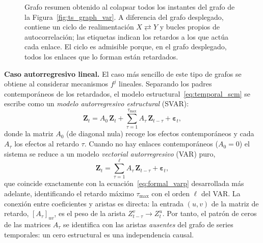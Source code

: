 \documentclass[12pt]{report} %
\begin{document}
\begin{figure}[H]
    \centering
    \begingroup
    \shorthandoff{<>}
    \endgroup
    \caption[Grafo resumen del proceso autorregresivo bivariante]{Grafo resumen obtenido al colapsar todos los instantes del grafo de la Figura~\ref{fig:ts_graph_var}. A diferencia del grafo desplegado, contiene un ciclo de realimentación $X \rightleftarrows Y$ y bucles propios de autocorrelación; las etiquetas indican los retardos a los que actúa cada enlace. El ciclo es admisible porque, en el grafo desplegado, todos los enlaces que lo forman están retardados.}
    \label{fig:ts_summary_var}
\end{figure}

\textbf{Caso autorregresivo lineal.} El caso más sencillo de este tipo de grafos se obtiene al considerar mecanismos $f^j$ lineales. Separando los padres contemporáneos de los retardados, el modelo estructural~\eqref{eq:temporal_scm} se escribe como un \emph{modelo autorregresivo estructural} (SVAR):
\begin{equation}
    \mathbf{Z}_t = A_0\,\mathbf{Z}_t + \sum_{\tau=1}^{\tau_{\max}} A_\tau\,\mathbf{Z}_{t-\tau} + \boldsymbol{\varepsilon}_t,
    \label{eq:svar}
\end{equation}
donde la matriz $A_0$ (de diagonal nula) recoge los efectos contemporáneos y cada $A_\tau$ los efectos al retardo $\tau$. Cuando no hay enlaces contemporáneos ($A_0 = 0$) el sistema se reduce a un modelo \emph{vectorial autorregresivo} (VAR) puro,
\begin{equation}
    \mathbf{Z}_t = \sum_{\tau=1}^{\ell} A_\tau\,\mathbf{Z}_{t-\tau} + \boldsymbol{\varepsilon}_t,
    \label{eq:var_p}
\end{equation}
que coincide exactamente con la ecuación~\eqref{eq:formal_varp} desarrollada más adelante, identificando el retardo máximo $\tau_{\max}$ con el orden $\ell$ del VAR. La conexión entre coeficientes y aristas es directa: la entrada $(u,v)$ de la matriz de retardo, $[A_\tau]_{uv}$, es el peso de la arista $Z^v_{t-\tau} \rightarrow Z^u_t$. Por tanto, el patrón de ceros de las matrices $A_\tau$ se identifica con las aristas \emph{ausentes} del grafo de series temporales: un cero estructural es una independencia causal.
\end{document}

